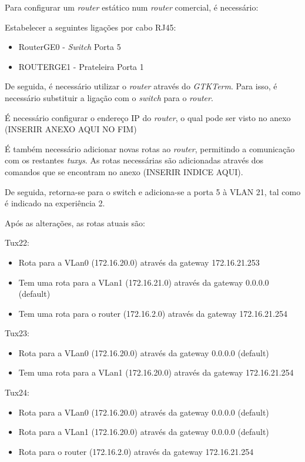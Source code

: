 \documentclass[11pt]{article}
\begin{document}
Para configurar um \textit{router} estático num \textit{router} comercial, é necessário:

Estabelecer a seguintes ligações por cabo RJ45:
\begin{itemize}
\item RouterGE0 - \textit{Switch} Porta 5
\item ROUTERGE1 - Prateleira Porta 1  
\end{itemize}

De seguida, é necessário utilizar o \textit{router} através do \textit{GTKTerm}. Para isso, é necessário substituir a ligação com o \textit{switch} para o \textit{router}.

É necessário configurar o endereço IP do \textit{router}, o qual pode ser visto no anexo (INSERIR ANEXO AQUI NO FIM)

É também necessário adicionar novas rotas ao \textit{router}, permitindo a comunicação com os restantes \textit{tuxys}. As rotas necessárias são adicionadas através dos comandos que se encontram no anexo (INSERIR INDICE AQUI).

De seguida, retorna-se para o switch e adiciona-se a porta 5 à VLAN 21, tal como é indicado na experiência 2.

Após as alterações, as rotas atuais são:

Tux22:
\begin{itemize}
\item Rota para a VLan0 (172.16.20.0) através da gateway 172.16.21.253
\item Tem uma rota para a VLan1 (172.16.21.0) através da gateway 0.0.0.0 (default)
\item Tem uma rota para o router (172.16.2.0) através da gateway 172.16.21.254
\end{itemize}

Tux23:
\begin{itemize}
\item Rota para a VLan0 (172.16.20.0) através da gateway 0.0.0.0 (default)
\item Tem uma rota para a VLan1 (172.16.20.0) através da gateway 172.16.21.254
\end{itemize}

Tux24:
\begin{itemize}
\item Rota para a VLan0 (172.16.20.0) através da gateway 0.0.0.0 (default)
\item Rota para a VLan1 (172.16.20.0) através da gateway 0.0.0.0 (default)
\item Rota para o router (172.16.2.0) através da gateway 172.16.21.254
\end{itemize}
\end{document}
